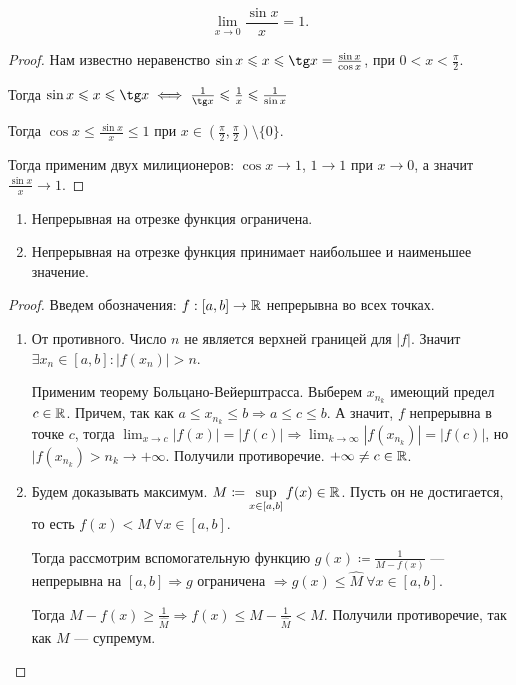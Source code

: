 \begin{theorem}
    \[
        \lim_{x\to 0} \frac{\sin x}{x} = 1
    .\] 
\end{theorem}
\begin{proof}
    Нам известно неравенство $\sin x \le x \le \tg x = \frac{\sin x}{\cos x}$, при $0 < x < \frac{\pi}{2}$. 

    Тогда $\sin x \le x \le \tg x \iff \frac{1}{\tg x} \le \frac{1}{x} \le \frac{1}{\sin x}$

    Тогда $\cos x \le \frac{\sin x}{x} \le 1$ при $x \in \left(\frac{\pi}{2}, \frac{\pi}{2}\right) \setminus \{0\}$.

    Тогда применим двух милиционеров: $\cos x \to 1$,  $1 \to 1$ при $x\to 0$, а значит  $\frac{\sin x}{x} \to 1$.
\end{proof}
\begin{theorem}
\slashn
\begin{enumerate}
    \item Непрерывная на отрезке функция ограничена.
    \item Непрерывная на отрезке функция принимает наибольшее и наименьшее значение.
\end{enumerate}
\end{theorem}
\begin{proof}
    Введем обозначения: $f: [a, b] \to \mathbb{R}$ непрерывна во всех точках.
    \begin{enumerate}
        \item От противного. Число $n$ не является верхней границей для  $|f|$. Значит  $\exists x_n \in [a, b]\!: |f(x_n)| > n$.  

            Применим теорему Больцано-Вейерштрасса. Выберем $x_{n_k}$ имеющий предел  $c \in \mathbb{R}$. Причем, так как  $a \le x_{n_k} \le b \Rightarrow a \le c \le b$. А значит, $f$ непрерывна в точке  $c$, тогда  $\displaystyle \lim_{x\to c}|f(x)| = |f(c)| \Rightarrow \lim_{k \to \infty} |f(x_{n_k})| = |f(c)|$, но $|f(x_{n_k}) > n_k \to +\infty$. Получили противоречие.  $+\infty \neq c \in \mathbb{R}$.
        \item Будем доказывать максимум.  $\displaystyle M \coloneqq \sup_{x \in [a ,b]} f(x) \in \mathbb{R}$. Пусть он не достигается, то есть $f(x) < M\ \forall x \in [a, b]$. 

            Тогда рассмотрим вспомогательную функцию $g(x) \coloneqq \frac{1}{M - f(x)}$ --- непрерывна на $[a, b] \Rightarrow g$ ограничена  $\Rightarrow g(x) \le \widehat{M}\ \forall x \in [a, b]$.

            Тогда $M - f(x) \ge \frac{1}{\widehat{M}} \Rightarrow f(x) \le M - \frac{1}{\widehat{M}} < M$. Получили противоречие, так как $M$ --- супремум.
    \end{enumerate}
\end{proof}
